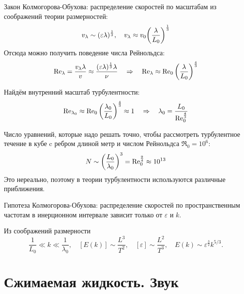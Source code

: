 Закон Колмогорова-Обухова: распределение скоростей по масштабам из
соображений теории размерностей:
\begin{equation}
    v_\lambda \sim (\varepsilon \lambda)^\frac{1}{3}, 
    \quad 
    v_\lambda \approx v_0 \qty(\frac{\lambda}{L_0})^\frac{1}{3}
\end{equation}
Отсюда можно получить поведение числа Рейнольдса:
\begin{equation}
    \Re_{\lambda} = \frac{v_\lambda \lambda}{v} \approx 
        \frac{(\varepsilon \lambda)^\frac{1}{3} \lambda}{\nu} 
        \quad\Rightarrow\quad 
        \Re_\lambda \approx \Re_0 \qty(\frac{\lambda}{L_0})^\frac{4}{3}
\end{equation}

Найдём внутренний масштаб турбулентности:
\begin{equation}
    \Re_{\lambda_0} \approx \Re_0 
        \qty(\frac{\lambda_0}{L_0})^\frac{4}{3}    \approx 1 
        \quad\Rightarrow\quad 
        \lambda_0 = \frac{L_0}{\Re_0^\frac{4}{3}}
\end{equation}

Число уравнений, которые надо решать точно, чтобы 
рассмотреть турбулентное течение в кубе c ребром длиной метр и числом Рейнольдса $\Re_0=10^6$:
\begin{equation}
    N \sim \qty(\frac{L_0}{\lambda_0})^3= \Re_0^{\frac{9}{4}} \approx 10^{13} 
\end{equation}
Это нереально, поэтому в теории турбулентности используются различные
приближения.

Гипотеза Колмогорова-Обухова: распределение скоростей по пространственным частотам в инерционном интервале зависит только от $\varepsilon$ и $k$.

Из соображений размерности
\begin{equation}
    \frac{1}{L_0} \ll k \ll \frac{1}{\lambda_0}, \quad
    [E(k)] \sim \frac{L^3}{T^2}, \quad [\varepsilon]\sim \frac{L^2}{T^3},
    \quad  E(k) \sim \varepsilon^\frac{3}{2} k^{5/3}.
\end{equation}

\section{Сжимаемая жидкость. Звук}

